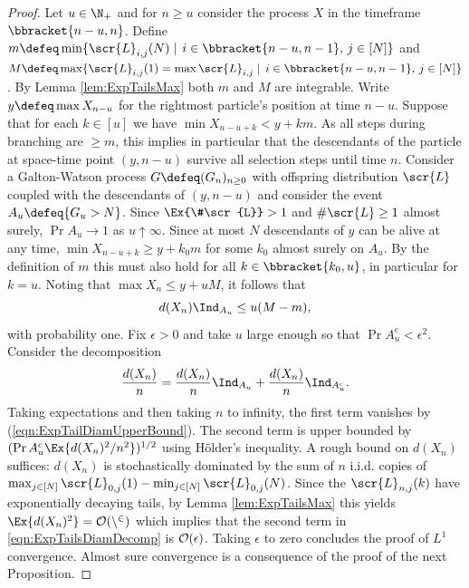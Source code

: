 \begin{proof}
Let $u \in \N_+$ and for $n \geq u$ consider the process $X$ in the timeframe $\bbracket{n - u, n}$. Define $m \defeq \min\{ \scr{L}_{i, j}(N) \mid\, i \in \bbracket{n-u, n-1},\, j \in [N]\}$ and $M \defeq \max\{ \scr{L}_{i, j}(1) = \max\scr{L}_{i,j} \mid\, i \in \bbracket{n-u, n-1},\, j \in [N]\}$. By Lemma \ref{lem:ExpTailsMax} both $m$ and $M$ are integrable. Write $y \defeq \max X_{n - u}$ for the rightmost particle's position at time $n-u$. Suppose that for each $k \in [u]$ we have $\min X_{n - u + k} < y + k m$. As all steps during branching are $ \geq m$, this implies in particular that the descendants of the particle at space-time point $(y, n-u)$ survive all selection steps until time $n$. Consider a Galton-Watson process $G \defeq (G_n)_{n \geq 0}$ with offspring distribution $\scr{L}$ coupled with the descendants of $(y, n-u)$ and consider the event $A_u \defeq \{ G_u > N\}$. Since $\Ex{\#\scr{L}} > 1$ and $\#\scr{L} \geq 1$ almost surely, $\Pr{A_u} \to 1$ as $u \uparrow \infty$. Since at most $N$ descendants of $y$ can be alive at any time, $\min X_{n - u + k} \geq y + k_0 m$ for some $k_0$ almost surely on $A_u$. By the definition of $m$ this must also hold for all $k \in \bbracket{k_0, u}$, in particular for $k = u$. Noting that $\max X_n \leq y + u M$, it follows that 
\begin{equation}\label{eqn:ExpTailDiamUpperBound}
d(X_n)\Ind_{A_u} \leq u (M - m), 
\end{equation}
with probability one. Fix $\epsilon > 0$ and take $u$ large enough so that $\Pr{A_u^c} < \epsilon^2$. Consider the decomposition
\begin{equation}\label{eqn:ExpTailsDiamDecomp}
\frac{d(X_n)}{n} = \frac{d(X_n)}{n} \Ind_{A_u} + \frac{d(X_n)}{n} \Ind_{A_u^c}. 
\end{equation}
Taking expectations and then taking $n$ to infinity, the first term vanishes by (\ref{eqn:ExpTailDiamUpperBound}). The second term is upper bounded by $(\Pr{A_u^c} \Ex{d(X_n)^2 / n^2})^{1/2}$ using Hölder's inequality. A rough bound on $d(X_n)$ suffices: $d(X_n)$ is stochastically dominated by the sum of $n$ i.i.d. copies of $\max_{j \in [N]} \scr{L}_{0, j}(1) - \min_{j \in [N]} \scr{L}_{0,j}(N)$. Since the $\scr{L}_{n,j}(k)$ have exponentially decaying tails, by Lemma \ref{lem:ExpTailsMax} this yields $\Ex{d(X_n)^2} = \cal{O}(n^2)$ which implies that the second term in \ref{eqn:ExpTailsDiamDecomp} is $\cal{O}(\epsilon)$. Taking $\epsilon$ to zero concludes the proof of $L^1$ convergence. Almost sure convergence is a consequence of the proof of the next Proposition. 
\end{proof}

